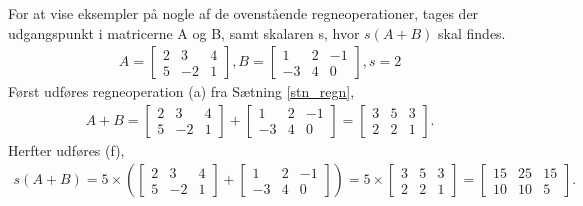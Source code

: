 \begin{eks}
For at vise eksempler på nogle af de ovenstående regneoperationer, tages der udgangspunkt i matricerne A og B, samt skalaren s, hvor $s(A+B)$ skal findes.
\begin{align*}
A= \begin{bmatrix}
	2 & 3 & 4 \\
	5 & -2 & 1 	
\end{bmatrix},  
B= \begin{bmatrix}
	1 & 2 & -1 \\
	-3 & 4 & 0
\end{bmatrix},
s=2
\end{align*}
Først udføres regneoperation (a) fra Sætning \ref{stn_regn},
\begin{align*}
A+B= \begin{bmatrix}
	2 & 3 & 4 \\
	5 & -2 & 1 	
\end{bmatrix}  
+ \begin{bmatrix}
	1 & 2 & -1 \\
	-3 & 4 & 0
\end{bmatrix}
= \begin{bmatrix}
	3 & 5 & 3 \\
	2 & 2 & 1
\end{bmatrix}.
\end{align*}
Herfter udføres (f),
\begin{align*}
s(A+B)= 5 \times \left( \begin{bmatrix}
	2 & 3 & 4 \\
	5 & -2 & 1 	
\end{bmatrix}  
+ \begin{bmatrix}
	1 & 2 & -1 \\
	-3 & 4 & 0
\end{bmatrix} \right)
= 5 \times \begin{bmatrix}
	3 & 5 & 3 \\
	2 & 2 & 1
\end{bmatrix}
= \begin{bmatrix}
	15 & 25 & 15 \\
	10 & 10 & 5
\end{bmatrix}.
\end{align*}
\end{eks}


